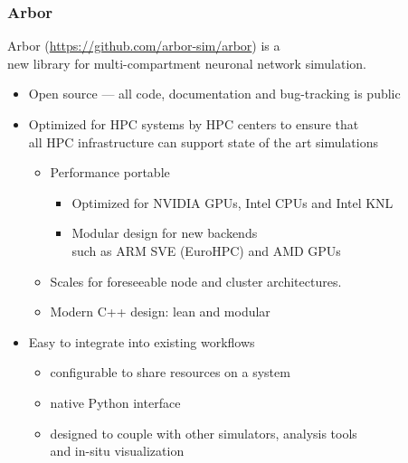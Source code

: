 \documentclass[aspectratio=43,12pt]{beamer}
\author{Alexander Peyser, FZ-J \& Sam Yates, CSCS}
\title{\arbor}
\subtitle{A new multi-compartment neuron simulator}
\date{\today}
\newcommand{\arbor}{Arbor}
\begin{document}
\addtolength{\headsep}{-0.3cm}
\begin{frame}[shrink]
\frametitle{\hspace{-0.5cm}\arbor}
\vspace{0.2\baselineskip}
\arbor{} (\url{https://github.com/arbor-sim/arbor}) is a \\\hspace{1em}\textcolor{cscsblue}{new} library for multi-compartment neuronal network simulation.
\setlength\leftmargini{1.2em}
\begin{itemize}%
\item \textcolor{cscsblue}{Open source} --- all code, documentation and bug-tracking is public
\item \textcolor{cscsblue}{Optimized} for HPC systems by HPC centers to ensure that\\\hspace{1em} all HPC infrastructure can support state of the art simulations
  \begin{itemize}
  \item Performance portable
    \begin{itemize}
    \item Optimized for NVIDIA GPUs, Intel CPUs and Intel KNL
    \item Modular design for new backends\\\hspace{1em} such as ARM SVE (EuroHPC) and AMD GPUs
    \end{itemize}
        
  \item Scales for foreseeable node and cluster architectures.
  \item Modern C++ design: lean and modular
  \end{itemize}
  
\item \textcolor{cscsblue}{Easy to integrate} into existing workflows
  \begin{itemize}
  \item configurable to share resources on a system
  \item native Python interface
  \item designed to couple with other simulators, analysis tools\\\hspace{1em} and in-situ visualization
  \end{itemize}
\end{itemize}
\vfill
\end{frame}
\end{document}
